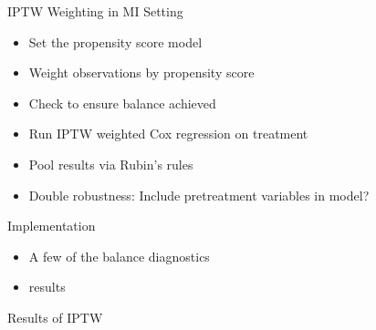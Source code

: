 \begin{frame}{IPTW Weighting in MI Setting}
\begin{itemize}
 \item Set the propensity score model
 \item Weight observations by propensity score
 \item Check to ensure balance achieved
 \item Run IPTW weighted Cox regression on treatment
 \item Pool results via Rubin's rules
 \item Double robustness: Include pretreatment variables in model?
\end{itemize} 
\end{frame}


\begin{frame}{Implementation}
 \begin{itemize}
  \item A few of the balance diagnostics
  \item results
 \end{itemize}

\end{frame}

\begin{frame}{Results of IPTW}
 \begin{table}[]
\centering
{}
\caption{ATE with IPTW weights, AC and MI}

\end{table}
 
\end{frame}

